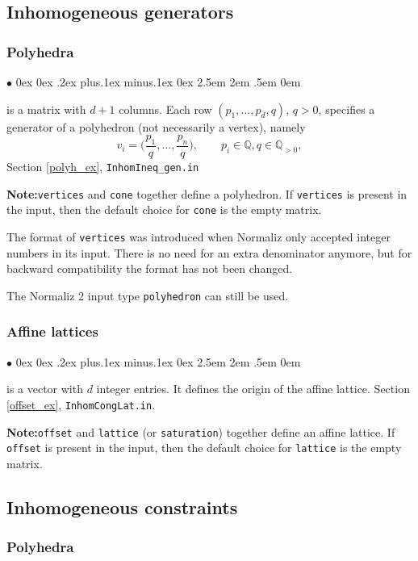 \documentclass[12pt,a4paper]{scrartcl}
\newcommand{\stdli}{ \topsep0ex \partopsep0ex %
\parsep.2ex plus.1ex minus.1ex \itemsep0ex%
\leftmargin2.5em \labelwidth2em \labelsep.5em \rightmargin0em}%
\renewenvironment{itemize}{\begin{list}{{$\bullet$}}{\stdli}}{\end{list}}
\theoremstyle{definition}
\def\QQ{{\mathbb Q}}
\def\itemtt[#1]{\item[\textbf{\ttt{#1}}]}
\def\ttt{\texttt}
\begin{document}
\subsection{Inhomogeneous generators}

\subsubsection{Polyhedra}

\begin{itemize}
	\itemtt[vertices] is a matrix with $d+1$ columns. Each row $(p_1,\dots,p_d,q)$, $q>0$, specifies a generator of a polyhedron (not necessarily a vertex), namely
	$$
	v_i=\biggl(\frac{p_{1}}{q},\dots,\frac{p_{n}}{q}\biggr), \qquad p_i\in\QQ,q\in\QQ_{>0},
	$$
	Section \ref{polyh_ex}, \verb|InhomIneq_gen.in|
	
	\textbf{Note:}\enspace \verb|vertices| and \verb|cone| together define a polyhedron. If \verb|vertices| is present in the input, then the default choice for \verb|cone| is the empty matrix.
\end{itemize}

The format of \verb|vertices| was introduced when Normaliz only accepted integer numbers in its input. There is no need for an extra denominator anymore, but for backward compatibility the format has not been changed.

The Normaliz 2 input type \verb|polyhedron| can still be used.

\subsubsection{Affine lattices}

\begin{itemize}
	\itemtt[offset] is a vector with $d$ integer entries. It defines the origin of the affine lattice.
	Section \ref{offset_ex}, \verb|InhomCongLat.in|.
\end{itemize}

\textbf{Note:}\enspace \verb|offset| and \verb|lattice| (or \verb|saturation|) together define an affine lattice. If \verb|offset| is present in the input, then the default choice for \verb|lattice| is the empty matrix.

\subsection{Inhomogeneous constraints}

\subsubsection{Polyhedra}
\end{document}
